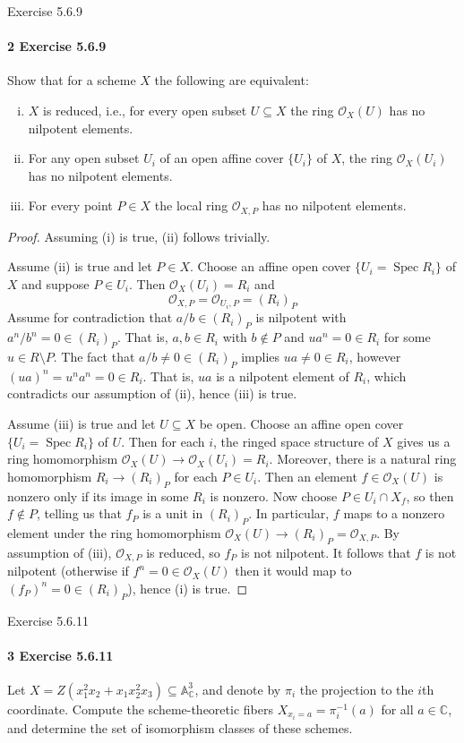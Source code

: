 \documentclass[12pt]{article}
\newlength{\myparskip}
\newenvironment{fullbox}{\begin{lrbox}{\savefullbox}\begin{minipage}{\dimexpr\textwidth-2\fboxsep\relax}\setlength{\parskip}{\myparskip}}{\end{minipage}\end{lrbox}\framebox[\textwidth]{\usebox{\savefullbox}}}
\newenvironment{pbox}[1][]{\begin{fullbox}\ifx#1\empty\else\paragraph{#1}\phantom{}\fi}{\end{fullbox}}
\theoremstyle{definition}
\newcommand{\C}{\mathbb{C}}
\newcommand{\A}{\mathbb{A}}
\newcommand{\<}{\langle}
\renewcommand{\>}{\rangle}
\DeclareMathOperator{\Spec}{Spec}
\renewcommand{\O}{\mathcal{O}}
\begin{document}
\newpage
\begin{pbox}[2 Exercise 5.6.9]
    Show that for a scheme $X$ the following are equivalent:
    \begin{enumerate}[(i)]
    \item $X$ is reduced, i.e., for every open subset $U \subseteq X$ the ring $\O_X(U)$ has no nilpotent elements.
    \item For any open subset $U_i$ of an open affine cover $\{U_i\}$ of $X$, the ring $\O_X(U_i)$ has no nilpotent elements.
    \item For every point $P \in X$ the local ring $\O_{X, P}$ has no nilpotent elements.
    \end{enumerate}
\end{pbox}

\begin{proof}
    Assuming (i) is true, (ii) follows trivially.

    Assume (ii) is true and let $P \in X$.
    Choose an affine open cover $\{U_i = \Spec R_i\}$ of $X$ and suppose $P \in U_i$.
    Then $\O_X(U_i) = R_i$ and
    \[
        \O_{X, P} = \O_{U_i, P} = (R_i)_P
    \]
    Assume for contradiction that $a/b \in (R_i)_P$ is nilpotent with $a^n/b^n = 0 \in (R_i)_P$.
    That is, $a, b \in R_i$ with $b \notin P$ and $ua^n = 0 \in R_i$ for some $u \in R \setminus P$.
    The fact that $a/b \ne 0 \in (R_i)_P$ implies $ua \ne 0 \in R_i$, however $(ua)^n = u^na^n = 0 \in R_i$.
    That is, $ua$ is a nilpotent element of $R_i$, which contradicts our assumption of (ii), hence (iii) is true.

    Assume (iii) is true and let $U \subseteq X$ be open.
    Choose an affine open cover $\{U_i = \Spec R_i\}$ of $U$.
    Then for each $i$, the ringed space structure of $X$ gives us a ring homomorphism $\O_X(U) \to \O_X(U_i) = R_i$.
    Moreover, there is a natural ring homomorphism $R_i \to (R_i)_P$ for each $P \in U_i$.
    Then an element $f \in \O_X(U)$ is nonzero only if its image in some $R_i$ is nonzero.
    Now choose $P \in U_i \cap X_f$, so then $f \notin P$, telling us that $f_P$ is a unit in $(R_i)_P$.
    In particular, $f$ maps to a nonzero element under the ring homomorphism $\O_X(U) \to (R_i)_P = \O_{X, P}$.
    By assumption of (iii), $\O_{X, P}$ is reduced, so $f_P$ is not nilpotent.
    It follows that $f$ is not nilpotent (otherwise if $f^n = 0 \in \O_X(U)$ then it would map to $(f_P)^n = 0 \in (R_i)_P$), hence (i) is true.
\end{proof}


\newpage
\begin{pbox}[3 Exercise 5.6.11]
    Let $X = Z(x_1^2x_2 + x_1x_2^2x_3) \subseteq \A_\C^3$, and denote by $\pi_i$ the projection to the $i$th coordinate.
    Compute the scheme-theoretic fibers $X_{x_i = a} = \pi_i^{-1}(a)$ for all $a \in \C$, and determine the set of isomorphism classes of these schemes.
\end{pbox}
\end{document}
